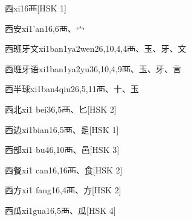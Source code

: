 \begin{entry}{西}{xi1}{6}{⾑}[HSK 1]
\end{entry}

\begin{entry}{西安}{xi1'an1}{6,6}{⾑、⼧}
\end{entry}

\begin{entry}{西班牙文}{xi1ban1ya2wen2}{6,10,4,4}{⾑、⽟、⽛、⽂}
\end{entry}

\begin{entry}{西班牙语}{xi1ban1ya2yu3}{6,10,4,9}{⾑、⽟、⽛、⾔}
\end{entry}

\begin{entry}{西半球}{xi1ban4qiu2}{6,5,11}{⾑、⼗、⽟}
\end{entry}

\begin{entry}{西北}{xi1 bei3}{6,5}{⾑、⼔}[HSK 2]
\end{entry}

\begin{entry}{西边}{xi1bian1}{6,5}{⾑、⾡}[HSK 1]
\end{entry}

\begin{entry}{西部}{xi1 bu4}{6,10}{⾑、⾢}[HSK 3]
\end{entry}

\begin{entry}{西餐}{xi1 can1}{6,16}{⾑、⾷}[HSK 2]
\end{entry}

\begin{entry}{西方}{xi1 fang1}{6,4}{⾑、⽅}[HSK 2]
\end{entry}

\begin{entry}{西瓜}{xi1gua1}{6,5}{⾑、⽠}[HSK 4]
\end{entry}

